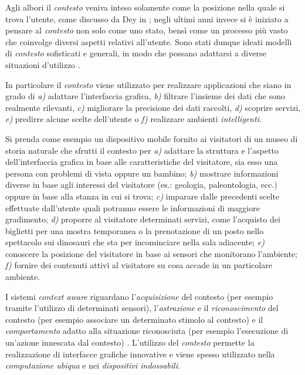Agli albori il \emph{contesto} veniva inteso solamente come la posizione nella quale si trova l'utente, come discusso da Dey in \cite{dey2001understanding}; negli ultimi anni invece si è iniziato a pensare al \emph{contesto} non solo come uno stato, bensì come un processo più vasto che coinvolge diversi aspetti relativi all'utente. Sono stati dunque ideati modelli di \emph{contesto} sofisticati e generali, in modo che possano adattarsi a diverse situazioni d'utilizzo \cite{DBLP:journals/sigmod/BolchiniCQST07} \cite{baldauf2007survey}.

In particolare il \emph{contesto} viene utilizzato per realizzare applicazioni che siano in grado di \emph{a)} adattare l'interfaccia grafica, \emph{b)} filtrare l'insieme dei dati che sono realmente rilevanti, \emph{c)} migliorare la precisione dei dati raccolti, \emph{d)} scoprire servizi, \emph{e)} predirre alcune scelte dell'utente o \emph{f)} realizzare ambienti \emph{intelligenti}.

Si prenda come esempio un dispositivo mobile fornito ai visitatori di un museo di storia naturale che sfrutti il contesto per \emph{a)} adattare la struttura e l'aspetto dell'interfaccia grafica in base alle caratteristiche del visitatore, sia esso una persona con problemi di vista oppure un bambino; \emph{b)} mostrare informazioni diverse in base agli interessi del visitatore (es.: geologia, paleontologia, ecc.) oppure in base alla stanza in cui si trova; \emph{c)} imparare dalle precedenti scelte effettuate dall'utente quali potranno essere le informazioni di maggiore gradimento; \emph{d)} proporre al visitatore determinati servizi, come l'acquisto dei biglietti per una mostra temporanea o la prenotazione di un posto nello spettacolo sui dinosauri che sta per incominciare nella sala adiacente; \emph{e)} conoscere la posizione del visitatore in base ai sensori che monitorano l'ambiente; \emph{f)} fornire dei contenuti attivi al visitatore su cosa accade in un particolare ambiente.

I sistemi \emph{context aware} riguardano l'\emph{acquisizione} del contesto (per esempio tramite l'utilizzo di determinati sensori), l'\emph{astrazione} e il \emph{riconoscimento} del contesto (per esempio associare un determinato stimolo al contesto) e il \emph{comportamento} adatto alla situazione riconosciuta (per esempio l'esecuzione di un'azione innescata dal contesto) \cite{schmidt2003ubiquitous}. L'utilizzo del \emph{contesto} permette la realizzazione di interfacce grafiche innovative e viene spesso utilizzato nella \emph{computazione ubiqua} e nei \emph{dispositivi indossabili}.

